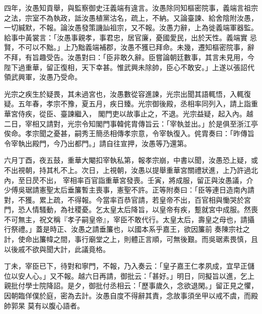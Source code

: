 \begin{pinyinscope}
 四年，汝愚知貢舉，與監察御史汪義端有違言。汝愚除同知樞密院事，義端言祖宗之法，宗室不為執政，詆汝愚植黨沽名，疏上，不納。又論臺諫、給舍陰附汝愚，一切緘默，不報。論汝愚發策譏訕祖宗，又不報。汝愚力辭，上為徙義端軍器監。給事中黃裳言：「汝愚事親孝，事君忠，居官廉，憂國愛民，出於天性。義端實
 忌賢，不可以不黜。」上乃黜義端補郡，汝愚不獲已拜命。未幾，遷知樞密院事，辭不拜，有旨趣受告。汝愚對曰：「臣非敢久辭。臣嘗論朝廷數事，其言未見用，今陛下過重華，留正復相，天下幸甚。惟武興未除帥，臣心不敢安。」上遂以張詔代領武興軍，汝愚乃受命。



 光宗之疾生於疑畏，其未過宮也，汝愚數從容進諫，光宗出聞其語輒悟，入輒復疑。五年春，孝宗不豫，夏五月，疾日臻。光宗御後殿，丞相率同列入，請上詣重華宮侍疾，從臣、臺諫繼入，
 閣門吏以故事止之，不退。光宗益疑，起入內。越二日，宰相又請對，光宗令知閣門事韓侂胄傳旨云：「宰執並出。」於是俱至浙江亭俟命。孝宗聞之憂甚，嗣秀王簡丞相傳孝宗意，令宰執復入。侂胄奏曰：「昨傳旨令宰執出殿門，今乃出都門。」請自往宣押，汝愚等乃還第。



 六月丁酉，夜五鼓，重華大閹扣宰執私第，報孝宗崩，中書以聞，汝愚恐上疑，或不出視朝，持其札不上。次日，上視朝，汝愚以提舉重華宮關禮狀進，上乃許過北內，至日昃不出，
 宰相率百官詣重華宮發喪。壬寅，將成服，留正與汝愚議，介少傅吳琚請憲聖太后垂簾暫主喪事，憲聖不許。正等附奏曰：「臣等連日造南內請對，不獲。累上疏，不得報。今當率百恭官請，若皇帝不出，百官相與慟哭於宮門，恐人情騷動，為社稷憂。乞太皇太后降旨，以皇帝有疾，蹔就宮中成服。然喪不可無主，祝文稱『孝子嗣皇帝』，宰臣不敢代行。太皇太后，壽皇之母也，請攝行祭禮。」蓋是時正、汝愚之請垂簾也，以國本系乎嘉王，欲因簾前
 奏陳宗社之計，使命出簾幃之間，事行廟堂之上，則體正言順，可無後艱。而吳琚素畏慎，且以後戚不欲與聞大計，此議竟格。



 丁未，宰臣已下，待對和寧門，不報，乃入奏云：「皇子嘉王仁孝夙成，宜早正儲位以安人心。」又不報。越六日再請，御批云：「甚好。」明日，同擬旨以進，乞上親批付學士院降詔。是夕，御批付丞相云：「歷事歲久，念欲退閑。」留正見之懼，因朝臨佯僕於庭，密為去計。汝愚自度不得辭其責，念故事須坐甲以戒不虞，而殿帥郭杲
 莫有以腹心語者。




\end{pinyinscope}
